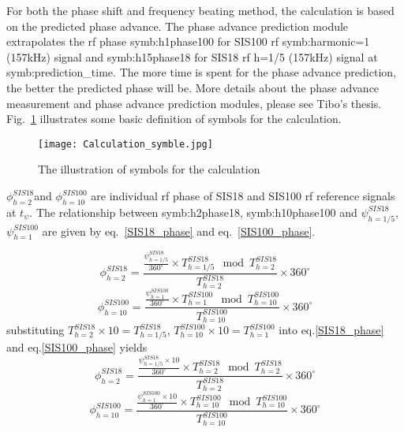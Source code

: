
For both the phase shift and frequency beating method, the calculation is based on the predicted phase advance. The phase advance prediction module extrapolates the rf phase \gls{symb:h1phase100} for SIS100 rf \gls{symb:harmonic}=1 (157kHz) signal and \gls{symb:h15phase18} for SIS18 rf h=1/5 (157kHz) signal at \gls{symb:prediction_time}. The more time is spent for the phase advance prediction, the better the predicted phase will be. More details about the phase advance measurement and phase advance prediction modules, please see Tibo's thesis. Fig.~\ref{Calculation_symble} illustrates some basic definition of symbols for the calculation. 
\begin{figure}[!htb]
   \centering   
   \texttt{[image: Calculation\_symble.jpg]}
   \caption{The illustration of symbols for the calculation}
   \label{Calculation_symble}
\end{figure}
$\phi_{h=2}^{SIS18}$and $\phi_{h=10}^{SIS100}$ are individual rf phase of SIS18 and SIS100 rf reference signals at $t_{\psi}$. The relationship between \gls{symb:h2phase18}, \gls{symb:h10phase100} and $\psi_{h=1/5}^{SIS18}$, $\psi_{h=1}^{SIS100}$ are given by eq.~\ref{SIS18_phase} and eq.~\ref{SIS100_phase}. 

\begin{equation}
\phi_{h=2}^{SIS18} =  \frac {\frac{\psi_{h=1/5}^{SIS18}}{360^\circ}\times {T_{h=1/5}^{SIS18}} \mod {T_{h=2}^{SIS18}}}{T_{h=2}^{SIS18}}\times {360^\circ} \label{SIS18_phase}
\end{equation}
\begin{equation}
\phi_{h=10}^{SIS100} =  \frac {\frac{\psi_{h=1}^{SIS100}}{360^\circ}\times {T_{h=1}^{SIS100}} \mod {T_{h=10}^{SIS100}}}{T_{h=10}^{SIS100}}\times {360^\circ} \label{SIS100_phase}
\end{equation}
substituting $T_{h=2}^{SIS18}\times 10=T_{h=1/5}^{SIS18}$, $T_{h=10}^{SIS100}\times 10=T_{h=1}^{SIS100}$ into eq.\ref{SIS18_phase} and eq.\ref{SIS100_phase} yields
 \begin{equation}
\phi_{h=2}^{SIS18} =  \frac {\frac{\psi_{h=1/5}^{SIS18}\times 10}{360^\circ}\times {T_{h=2}^{SIS18}} \mod {T_{h=2}^{SIS18}}}{T_{h=2}^{SIS18}}\times {360^\circ} \label{SIS18_phase1}
\end{equation}
\begin{equation}
\phi_{h=10}^{SIS100} =  \frac {\frac{\psi_{h=1}^{SIS100}\times 10}{360^\circ}\times {T_{h=10}^{SIS100}} \mod {T_{h=10}^{SIS100}}}{T_{h=10}^{SIS100}}\times {360^\circ} \label{SIS100_phase1}
\end{equation}

